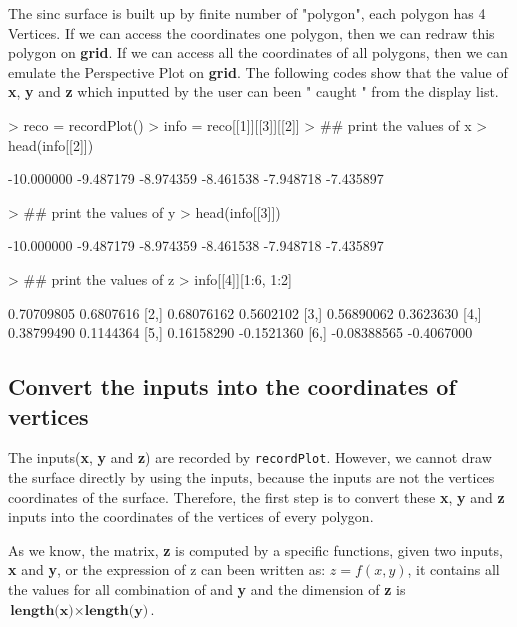 \documentclass{report}
\begin{document}
The sinc surface is built up by finite number of "polygon", each polygon has 4 Vertices.
If we can access the coordinates one polygon, then we can redraw this polygon on \textbf{grid}. If we can access all the coordinates of all polygons, then we can emulate the Perspective Plot on \textbf{grid}. The following codes show that the value of \textbf{x}, \textbf{y} and \textbf{z} which inputted by the user can been " caught " from the display list.
\begin{Schunk}
\begin{Sinput}
> reco = recordPlot()
> info = reco[[1]][[3]][[2]]
> ## print the values of x
> head(info[[2]])
\end{Sinput}
\begin{Soutput}
[1] -10.000000  -9.487179  -8.974359  -8.461538  -7.948718  -7.435897
\end{Soutput}
\begin{Sinput}
> ## print the values of y
> head(info[[3]])
\end{Sinput}
\begin{Soutput}
[1] -10.000000  -9.487179  -8.974359  -8.461538  -7.948718  -7.435897
\end{Soutput}
\begin{Sinput}
> ## print the values of z
> info[[4]][1:6, 1:2]
\end{Sinput}
\begin{Soutput}
            [,1]       [,2]
[1,]  0.70709805  0.6807616
[2,]  0.68076162  0.5602102
[3,]  0.56890062  0.3623630
[4,]  0.38799490  0.1144364
[5,]  0.16158290 -0.1521360
[6,] -0.08388565 -0.4067000
\end{Soutput}
\end{Schunk}
\subsection{Convert the inputs into the coordinates of vertices}
The inputs(\textbf{x}, \textbf{y} and \textbf{z}) are recorded by \texttt{recordPlot}. However, we cannot draw the surface directly by using the inputs, because the inputs are not the vertices coordinates of the surface. Therefore, the first step is to convert these \textbf{x}, \textbf{y} and \textbf{z} inputs into the coordinates of the vertices of every polygon.


As we know, the matrix, \textbf{z} is computed by a specific functions, given two inputs, \textbf{x} and \textbf{y}, or the expression of z can been written as: $z = f(x,y)$, it contains all the values for all combination of  and \textbf{y} and the dimension of \textbf{z} is $ \textbf{length(x)} \times \textbf{length(y)}$.\\
\end{document}

